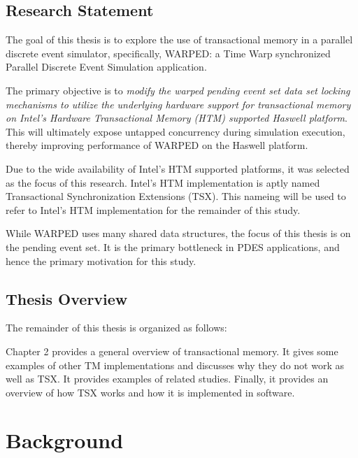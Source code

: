 \documentclass[a4paper]{article}
\begin{document}
\subsection{\textbf{Research Statement}}

\indent The goal of this thesis is to explore the use of transactional memory in
a parallel discrete event simulator, specifically, WARPED: a Time
Warp synchronized Parallel Discrete Event Simulation application.\par

\indent The primary objective is to \textit{modify the warped pending event set
    data set locking mechanisms to utilize the underlying hardware support for
    transactional memory on Intel's Hardware Transactional Memory (HTM)
supported Haswell platform}.  This will ultimately expose untapped concurrency
during simulation execution, thereby improving performance of WARPED on the
Haswell platform.\par

\indent Due to the wide availability of Intel's HTM supported platforms, it was
selected as the focus of this research.  Intel's HTM implementation is aptly
named Transactional Synchronization Extensions (TSX).  This nameing will be used
to refer to Intel's HTM implementation for the remainder of this study.\par

\indent While WARPED uses many shared data structures, the focus of this thesis
is on the pending event set.  It is the primary bottleneck in PDES applications,
and hence the primary motivation for this study.\par

\subsection{\textbf{Thesis Overview}}

The remainder of this thesis is organized as follows:

\indent Chapter 2 provides a general overview of transactional memory.  It gives
some examples of other TM implementations and discusses why they do not work as
well as TSX.  It provides examples of related studies.  Finally, it provides an
overview of how TSX works and how it is implemented in software.\par

\newpage

\section{\textbf{Background}}
\end{document}
